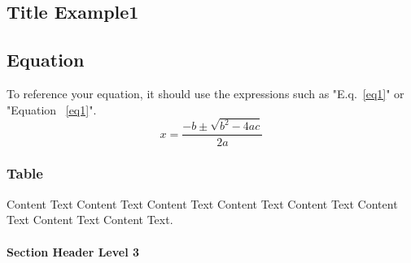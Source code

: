 \begin{Chapter}

\chapter{Title Example1}

\section{Equation}
To reference your equation, it should use the expressions such as "E.q.~\eqref{eq1}" or "Equation ~\eqref{eq1}".
\begin{equation}\label{eq1}
    \mbox{$x = \dfrac{-b\pm\sqrt{b^2-4ac}}{2a}$}
\end{equation}

\subsection{Table}

\text Content Text Content Text Content Text Content Text Content Text Content Text Content Text Content Text.

\begin{table*}[htbp]
    \centering
    \caption{Table Example AAA.} \label{tab: complexity1}
\end {table*}

\subsubsection{Section Header Level 3}


\end{Chapter}
